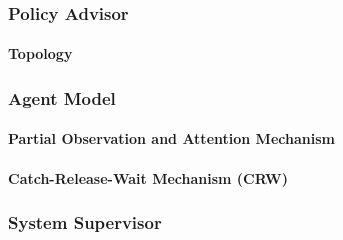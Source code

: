 \documentclass{article}
\begin{document}
	\subsubsection{Policy Advisor}

	\paragraph{Topology}



	\subsubsection{Agent Model}

	\paragraph{Partial Observation and Attention Mechanism}

	\paragraph{Catch-Release-Wait Mechanism (CRW)}

	\subsubsection{System Supervisor}
\end{document}
